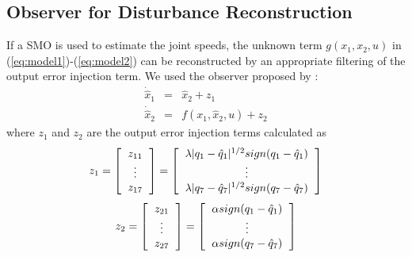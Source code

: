 \documentclass[a4paper, 10pt]{article}
\begin{document}
\subsection{Observer for Disturbance Reconstruction}
If a SMO is used to estimate the joint speeds, the unknown term $g(x_1, x_2, u)$ in (\ref{eq:model1})-(\ref{eq:model2}) can be reconstructed by an appropriate filtering of the output error injection term. We used the observer proposed by \cite{shtessel2014sliding}:
  \begin{eqnarray}
    \dot{\hat{x}}_1 &=& \hat{x}_2 + z_1\label{eq:observer1}\\
    \dot{\hat{x}}_2 &=& f(x_1, \hat{x}_2, u) + z_2\label{eq:observer2}
  \end{eqnarray}
  where $z_1$ and $z_2$ are the output error injection terms calculated as
  \begin{equation*}z_1 =
    \left[\begin{tabular}{c}
        $z_{11}$\\
        $\vdots$\\
        $z_{17}$
    \end{tabular}\right] = 
    \left[\begin{tabular}{c}
        $\lambda\vert q_1 - \hat{q}_1\vert ^{1/2}sign(q_1 - \hat{q}_1)$ \\
        $\vdots$\\
        $\lambda\vert q_7 - \hat{q}_7\vert ^{1/2}sign(q_7 - \hat{q}_7)$
    \end{tabular}\right]
\end{equation*}
\begin{equation*}z_2 =
  \left[\begin{tabular}{c}
      $z_{21}$\\
      $\vdots$\\
      $z_{27}$
    \end{tabular}\right] = 
  \left[\begin{tabular}{c}
      $\alpha sign(q_1 - \hat{q}_1)$ \\
      $\vdots$\\
      $\alpha sign(q_7 - \hat{q}_7)$
    \end{tabular}\right]
\end{equation*}
\end{document}
